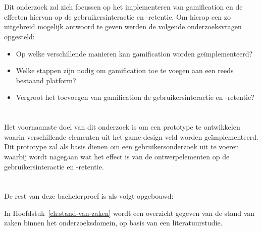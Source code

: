 \section{}
\label{sec:onderzoeksvraag}

Dit onderzoek zal zich focussen op het implementeren van gamification en de effecten hiervan op de gebruikersinteractie en -retentie. Om hierop een zo uitgebreid mogelijk antwoord te geven werden de volgende onderzoeksvragen opgesteld:

\begin{itemize}
 \item Op welke verschillende manieren kan gamification worden geïmplementeerd?
 \item Welke stappen zijn nodig om gamification toe te voegen aan een reeds bestaand platform?
 \item Vergroot het toevoegen van gamification de gebruikersinteractie en -retentie?
\end{itemize}

\section{}
\label{sec:onderzoeksdoelstelling}

Het voornaamste doel van dit onderzoek is om een prototype te ontwikkelen waarin verschillende elementen uit het game-design veld worden geïmplementeerd. Dit prototype zal als basis dienen om een gebruikersonderzoek uit te voeren waarbij wordt nagegaan wat het effect is van de ontwerpelementen op de gebruikersinteractie en -retentie.

\section{}
\label{sec:opzet-bachelorproef}


De rest van deze bachelorproef is als volgt opgebouwd:

In Hoofdstuk~\ref{ch:stand-van-zaken} wordt een overzicht gegeven van de stand van zaken binnen het onderzoeksdomein, op basis van een literatuurstudie.

